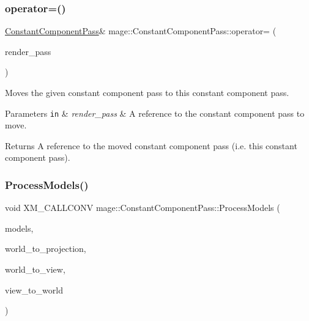 \subsubsection{\texorpdfstring{operator=()}{operator=()}\hspace{0.1cm}{\footnotesize\ttfamily [2/2]}}
{\footnotesize\ttfamily \hyperlink{classmage_1_1_constant_component_pass}{Constant\+Component\+Pass}\& mage\+::\+Constant\+Component\+Pass\+::operator= (\begin{DoxyParamCaption}\item[{\hyperlink{classmage_1_1_constant_component_pass}{Constant\+Component\+Pass} \&\&}]{render\+\_\+pass }\end{DoxyParamCaption})\hspace{0.3cm}{\ttfamily [delete]}}

Moves the given constant component pass to this constant component pass.


\begin{DoxyParams}[1]{Parameters}
\mbox{\tt in}  & {\em render\+\_\+pass} & A reference to the constant component pass to move. \\
\hline
\end{DoxyParams}
\begin{DoxyReturn}{Returns}
A reference to the moved constant component pass (i.\+e. this constant component pass). 
\end{DoxyReturn}
\hypertarget{classmage_1_1_constant_component_pass_a4d3b510a03f9612c73be230662470bf0}{}\label{classmage_1_1_constant_component_pass_a4d3b510a03f9612c73be230662470bf0} 
\subsubsection{\texorpdfstring{Process\+Models()}{ProcessModels()}}
{\footnotesize\ttfamily void X\+M\+\_\+\+C\+A\+L\+L\+C\+O\+NV mage\+::\+Constant\+Component\+Pass\+::\+Process\+Models (\begin{DoxyParamCaption}\item[{const vector$<$ const \hyperlink{classmage_1_1_model_node}{Model\+Node} $\ast$ $>$ \&}]{models,  }\item[{F\+X\+M\+M\+A\+T\+R\+IX}]{world\+\_\+to\+\_\+projection,  }\item[{C\+X\+M\+M\+A\+T\+R\+IX}]{world\+\_\+to\+\_\+view,  }\item[{C\+X\+M\+M\+A\+T\+R\+IX}]{view\+\_\+to\+\_\+world }\end{DoxyParamCaption})\hspace{0.3cm}{\ttfamily [private]}}

